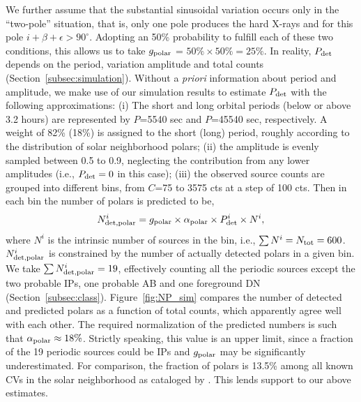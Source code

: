 \documentclass[fleqn,usenatbib]{mnras}
\begin{document}
We further assume that the substantial sinusoidal variation occurs only in the ``two-pole'' situation, that is, only one pole produces the hard X-rays and for this pole $i+\beta+\epsilon > 90^{\circ}$. 
Adopting an 50\% probability to fulfill each of these two conditions, this allows us to take $g_{\rm polar}$ = $50\%\times50\% = 25\%$. In reality, $P_{\rm det}$ depends on the period, variation amplitude and total counts (Section~\ref{subsec:simulation}). 
Without a {\it  priori} information about period and amplitude, we make use of our simulation results to estimate $P_{\rm det}$ with the following approximations:
(i) The short and long orbital periods (below or above 3.2 hours) are represented by $P$=5540 sec and $P$=45540 sec, respectively. A weight of 82\% (18\%) is assigned to the short (long) period, roughly according to the distribution of solar neighborhood polars; 
(ii) the amplitude is evenly sampled between 0.5 to 0.9, neglecting the contribution from any lower amplitudes (i.e., $P_{\rm det} = 0$ in this case);
(iii) the observed source counts are grouped into different bins, from $C$=75 to 3575 cts at a step of 100 cts.  
Then in each bin the number of polars is predicted to be,
\begin{equation}
N_{\rm det,polar}^i =  g_{\rm polar} \times \alpha_{\rm polar} \times P_{\rm det}^i \times N^i,
\end{equation}
where $N^i$ is the intrinsic number of sources in the bin, i.e., $\sum{N^i}=N_{\rm tot}=600$.  
$N_{\rm det,polar}^i$ is constrained by the number of actually detected polars in a given bin.
We take $\sum{N_{\rm det,polar}^i} = 19$, effectively counting all the periodic sources except the two probable IPs, one probable AB and one foreground DN (Section~\ref{subsec:class}).
Figure~\ref{fig:NP_sim} compares the number of detected and predicted polars as a function of total counts, which apparently agree well with each other.  
The required normalization of the predicted numbers is such that $\alpha_{\rm polar} \approx 18\%$. Strictly speaking, this value is an upper limit, since a fraction of the 19 periodic sources could be IPs and $g_{\rm polar}$ may be significantly underestimated. 
For comparison, the fraction of polars is 13.5\% among all known CVs in the solar neighborhood as cataloged by \citet{2003A&A...404..301R}. This lends support to our above estimates.
\end{document}
